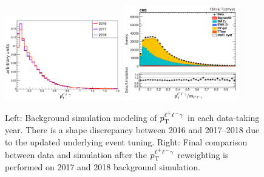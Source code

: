 \begin{figure}[tb]
	\begin{center}
		\includegraphics[width=0.45\textwidth, height=0.35\textwidth]{fig/zpt_reweight/ptm_year_comp.png}
		\includegraphics[width=0.45\textwidth, height=0.35\textwidth]{fig/zpt_reweight/pt_over_m_data_mc.png}
	\end{center}
	\caption{Left: Background simulation modeling of $p_{\mathrm{T}}^{\ell^{+}\ell^{-}\gamma}$ in each data-taking year. There is a shape discrepancy between 2016 and 2017--2018 due to the 
	updated underlying event tuning. Right: Final comparison between data and simulation after the $p_{\mathrm{T}}^{\ell^{+}\ell^{-}\gamma}$ reweighting is performed on 2017 and 2018 background simulation.}
	\label{fig:pt_reweight}
\end{figure}

